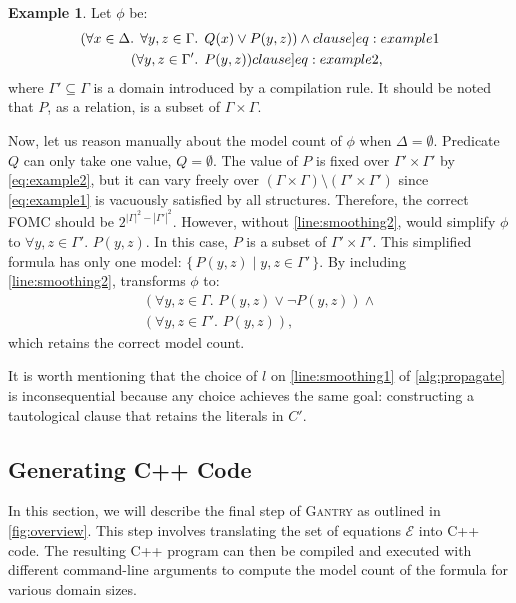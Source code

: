 \documentclass[letterpaper]{article} %
\theoremstyle{remark}
\theoremstyle{definition}
\newtheorem{example}{Example}
\newcommand{\Cranetwo}{\textsc{Gantry}}
\begin{document}
\begin{example}\label{example:basecasesmoothing}
  Let $\phi$ be:
  \begin{align}
    (\forall x \in \Delta\text{. }\forall y, z \in \Gamma&\text{. }Q(x) \lor P(y, z))\land{}\label[clause]{eq:example1}\\
    (\forall y, z \in \Gamma'&\text{. }P(y, z))\label[clause]{eq:example2},
  \end{align}
  where $\Gamma' \subseteq \Gamma$ is a domain introduced by a compilation rule.
  It should be noted that $P$, as a relation, is a subset of
  $\Gamma \times \Gamma$.

  Now, let us reason manually about the model count of $\phi$ when
  $\Delta = \emptyset$. Predicate $Q$ can only take one value, $Q = \emptyset$.
  The value of $P$ is fixed over $\Gamma' \times \Gamma'$ by \cref{eq:example2},
  but it can vary freely over
  $(\Gamma \times \Gamma) \setminus (\Gamma' \times \Gamma')$ since
  \cref{eq:example1} is vacuously satisfied by all structures. Therefore, the
  correct FOMC should be $2^{|\Gamma|^2 - |\Gamma'|^2}$. However, without
  \cref{line:smoothing2}, \Propagate would simplify $\phi$ to
  $\forall y, z \in \Gamma'\text{. }P(y, z)$. In this case, $P$ is a subset of
  $\Gamma' \times \Gamma'$. This simplified formula has only one model:
  $\{\, P(y, z) \mid y, z \in \Gamma' \,\}$. By including
  \cref{line:smoothing2}, \Propagate transforms $\phi$ to:
  \begin{gather*}
    (\forall y, z \in \Gamma\text{. }P(y, z) \lor \neg P(y, z))\land{}\\
    (\forall y, z \in \Gamma'\text{. }P(y, z)),
  \end{gather*}
  which retains the correct model count.
\end{example}

It is worth mentioning that the choice of $l$ on \cref{line:smoothing1} of
\cref{alg:propagate} is inconsequential because any choice achieves the same
goal: constructing a tautological clause that retains the literals in $C'$.

\subsection{Generating C++ Code}\label{sec:cpp}

In this section, we will describe the final step of \Cranetwo{} as outlined in
\cref{fig:overview}. This step involves translating the set of equations
$\mathcal{E}$ into C++ code. The resulting C++ program can then be compiled and
executed with different command-line arguments to compute the model count of the
formula for various domain sizes.
\end{document}
